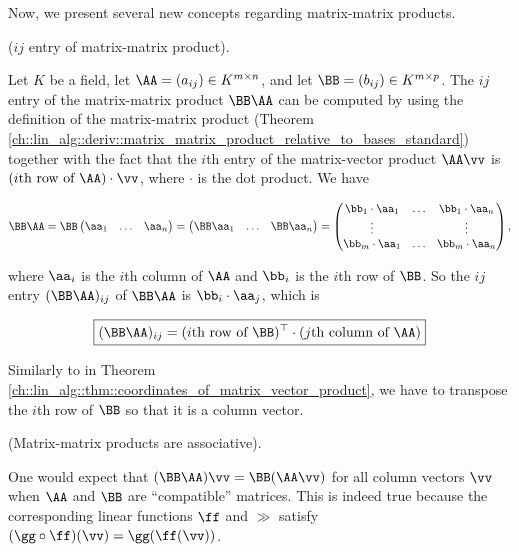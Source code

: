 Now, we present several new concepts regarding matrix-matrix products.

\begin{theorem}
\label{ch::lin_alg::thm::coordinates_of_matrix_matrix_product}

    ($ij$ entry of matrix-matrix product). 
    
    Let $K$ be a field, let $\AA = (a_{ij}) \in K^{m \times n}$, and let $\BB = (b_{ij}) \in K^{m \times p}$. The $ij$ entry of the matrix-matrix product $\BB \AA$ can be computed by using the definition of the matrix-matrix product (Theorem \ref{ch::lin_alg::deriv::matrix_matrix_product_relative_to_bases_standard}) together with the fact that the $i$th entry of the matrix-vector product $\AA \vv$ is $(\text{$i$th row of $\AA$}) \cdot \vv$, where $\cdot$ is the dot product. We have
    
    \begin{align*}
        \BB \AA
        = 
        \BB
        \begin{pmatrix}
            \aa_1 & \hdots & \aa_n
        \end{pmatrix}
        =
        \begin{pmatrix}
            \BB \aa_1 & \hdots & \BB \aa_n
        \end{pmatrix}
        =
        \begin{pmatrix}
            \bb_1 \cdot \aa_1 & \hdots & \bb_1 \cdot \aa_n \\
            \vdots & & \vdots \\
            \bb_m \cdot \aa_1 & \hdots & \bb_m \cdot \aa_n
        \end{pmatrix},
    \end{align*}
    
    where $\aa_i$ is the $i$th column of $\AA$ and $\bb_i$ is the $i$th row of $\BB$. So the $ij$ entry $(\BB \AA)_{ij}$ of $\BB \AA$ is $\bb_i \cdot \aa_j$, which is
    
    \begin{align*}
        \boxed
        {
            (\BB \AA)_{ij} = (\text{$i$th row of $\BB$})^\top \cdot (\text{$j$th column of $\AA$})
        }
    \end{align*}
    
    Similarly to in Theorem \ref{ch::lin_alg::thm::coordinates_of_matrix_vector_product}, we have to transpose the $i$th row of $\BB$ so that it is a column vector.
\end{theorem}

\begin{remark}
    (Matrix-matrix products are associative).
    
    One would expect that $(\BB \AA) \vv = \BB (\AA \vv)$ for all column vectors $\vv$ when $\AA$ and $\BB$ are ``compatible'' matrices. This is indeed true because the corresponding linear functions $\ff$ and $\gg$ satisfy $(\gg \circ \ff)(\vv) = \gg(\ff(\vv))$.
\end{remark}

